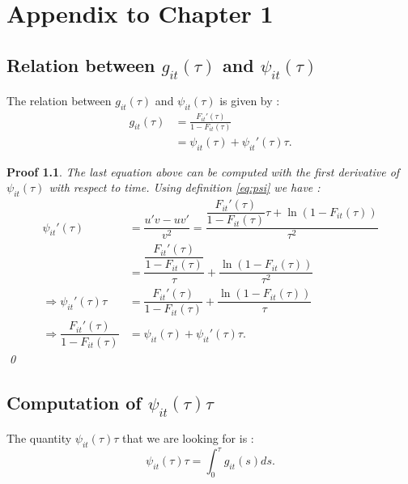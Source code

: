 \appendix

\chapter{Appendix to Chapter 1}
\section{Relation between $g_{it}(\tau)$ and $\psi_{it}(\tau)$}

The relation between $g_{it}(\tau)$ and $\psi_{it}(\tau)$  is given by :
\begin{align} \label{gphi}
    g_{it}(\tau) &= \frac{F_{it}'(\tau)}{1-F_{it}(\tau)} \nonumber \\
    &= \psi_{it}(\tau) + \psi_{it}'(\tau)\tau.
\end{align}

\newtheorem*{proof1}{Proof}
\begin{proof1}
The last equation above can be computed with the first derivative of $\psi_{it}(\tau)$ with respect to time. Using definition \ref{eq:psi} we have :
\begin{align*}
\psi_{it}'(\tau) &= \dfrac{u' v - u v'}{v^2} = \dfrac{\dfrac{F_{it}'(\tau)}{1-F_{it}(\tau)}\tau + \ln(1-F_{it}(\tau))}{\tau^2} \\
&= \dfrac{\dfrac{F_{it}'(\tau)}{1-F_{it}(\tau)}}{\tau} + \dfrac{\ln(1-F_{it}(\tau))}{\tau^2}\\
\Rightarrow \psi_{it}'(\tau) \tau &= \dfrac{F_{it}'(\tau)}{1-F_{it}(\tau)} + \dfrac{\ln(1-F_{it}(\tau))}{\tau}\\
\Rightarrow \dfrac{F_{it}'(\tau)}{1-F_{it}(\tau)} &= \psi_{it}(\tau) + \psi_{it}'(\tau) \tau.
\end{align*} \qed
\end{proof1}

\section{Computation of $\psi_{it}(\tau) \tau$}

The quantity $\psi_{it}(\tau) \tau$ that we are looking for is :
\begin{equation}
    \psi_{it}(\tau) \tau = \int_0^{\tau}g_{it}(s) ds.
\end{equation}

